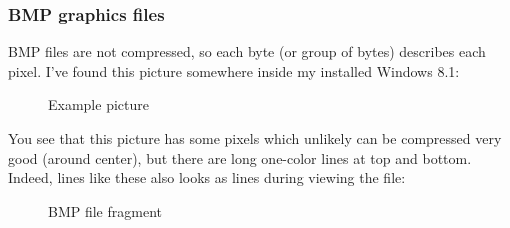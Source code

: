 \clearpage
\subsubsection{BMP graphics files}


BMP files are not compressed, so each byte (or group of bytes) describes each pixel.
I've found this picture somewhere inside my installed Windows 8.1:

\begin{figure}[H]
\centering
{}
\caption{Example picture}
\end{figure}

You see that this picture has some pixels which unlikely can be compressed very good (around center), 
but there are long one-color lines at top and bottom.
Indeed, lines like these also looks as lines during viewing the file:

\begin{figure}[H]
\centering
{}
\caption{BMP file fragment}
\end{figure}

